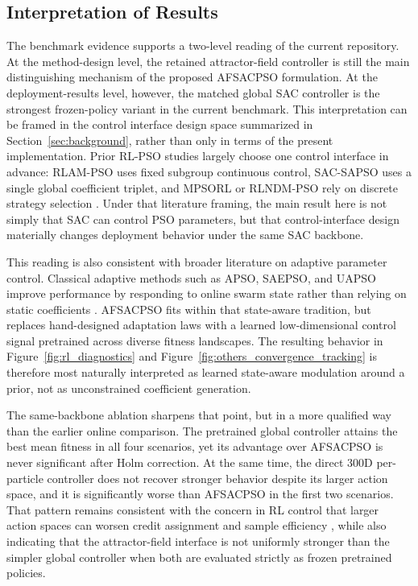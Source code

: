 \documentclass[final,5p,times]{elsarticle}
\begin{document}
\subsection{Interpretation of Results}
The benchmark evidence supports a two-level reading of the current repository.
At the method-design level, the retained attractor-field controller is still the main distinguishing mechanism of the proposed AFSACPSO formulation.
At the deployment-results level, however, the matched global SAC controller is the strongest frozen-policy variant in the current benchmark.
This interpretation can be framed in the control interface design space summarized in Section~\ref{sec:background}, rather than only in terms of the present implementation.
Prior RL-PSO studies largely choose one control interface in advance: RLAM-PSO uses fixed subgroup continuous control, SAC-SAPSO uses a single global coefficient triplet, and MPSORL or RLNDM-PSO rely on discrete strategy selection \cite{Yin2023RLAMPSO, vonEschwege2024Soft, Meng2023Multistrategy, Li2023Reinforcement}.
Under that literature framing, the main result here is not simply that SAC can control PSO parameters, but that control-interface design materially changes deployment behavior under the same SAC backbone.

This reading is also consistent with broader literature on adaptive parameter control.
Classical adaptive methods such as APSO, SAEPSO, and UAPSO improve performance by responding to online swarm state rather than relying on static coefficients \cite{Zhan2009Adaptive, Liu2025A, Isiet2019Selfadapting}.
AFSACPSO fits within that state-aware tradition, but replaces hand-designed adaptation laws with a learned low-dimensional control signal pretrained across diverse fitness landscapes.
The resulting behavior in Figure~\ref{fig:rl_diagnostics} and Figure~\ref{fig:others_convergence_tracking} is therefore most naturally interpreted as learned state-aware modulation around a prior, not as unconstrained coefficient generation.

The same-backbone ablation sharpens that point, but in a more qualified way than the earlier online comparison.
The pretrained global controller attains the best mean fitness in all four scenarios, yet its advantage over AFSACPSO is never significant after Holm correction.
At the same time, the direct 300D per-particle controller does not recover stronger behavior despite its larger action space, and it is significantly worse than AFSACPSO in the first two scenarios.
That pattern remains consistent with the concern in RL control that larger action spaces can worsen credit assignment and sample efficiency \cite{DulacArnold2015Deep, Zhou2020PLAS}, while also indicating that the attractor-field interface is not uniformly stronger than the simpler global controller when both are evaluated strictly as frozen pretrained policies.
\end{document}
